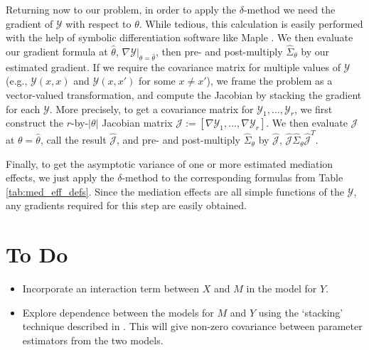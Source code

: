 \documentclass{article}
\newcommand{\sY}{\mathcal{Y}}
\begin{document}
Returning now to our problem, in order to apply the $\delta$-method we need the gradient of $\sY$ with respect to $\theta$. While tedious, this calculation is easily performed with the help of symbolic differentiation software like Maple \citep{Map20}. We then evaluate our gradient formula at $\hat{\theta}$, $\left. \nabla \sY \right|_{\theta = \hat{\theta}}$, then pre- and post-multiply $\hat{\Sigma}_\theta$ by our estimated gradient. If we require the covariance matrix for multiple values of $\sY$ (e.g., $\sY(x,x)$ and $\sY(x,x')$ for some $x \neq x'$), we frame the problem as a vector-valued transformation, and compute the Jacobian by stacking the gradient for each $\sY$. More precisely, to get a covariance matrix for $\sY_1, \ldots, \sY_r$, we first construct the $r$-by-$|\theta|$ Jacobian matrix $\mathcal{J} := [\nabla \sY_1, \ldots, \nabla \sY_r]$. We then evaluate $\mathcal{J}$ at $\theta = \hat{\theta}$, call the result $\hat{\mathcal{J}}$, and pre- and post-multiply $\hat{\Sigma}_\theta$ by $\hat{\mathcal{J}}$, $\hat{\mathcal{J}} \hat{\Sigma}_\theta \hat{\mathcal{J}}^T$.

Finally, to get the asymptotic variance of one or more estimated mediation effects, we just apply the $\delta$-method to the corresponding formulas from Table \ref{tab:med_eff_defs}. Since the mediation effects are all simple functions of the $\sY$, any gradients required for this step are easily obtained.


\section{To Do}
\begin{itemize}
    \item Incorporate an interaction term between $X$ and $M$ in the model for $Y$.
    \item Explore dependence between the models for $M$ and $Y$ using the `stacking' technique described in \citet{Bau06}. This will give non-zero covariance between parameter estimators from the two models.
\end{itemize}


% 
% 
\end{document}
